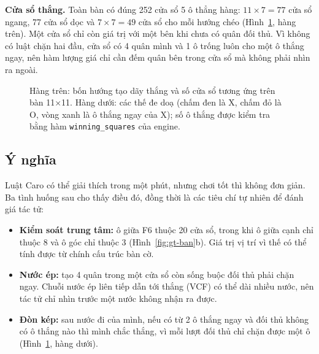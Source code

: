 \textbf{Cửa sổ thắng.} Toàn bàn có đúng 252 cửa sổ 5 ô thẳng hàng: $11 \times 7 = 77$ cửa sổ ngang, 77 cửa sổ dọc và $7 \times 7 = 49$ cửa sổ cho mỗi hướng chéo (Hình~\ref{fig:gt-mau}, hàng trên). Một cửa sổ chỉ còn giá trị với một bên khi chưa có quân đối thủ. Vì không có luật chặn hai đầu, cửa sổ có 4 quân mình và 1 ô trống luôn cho một ô thắng ngay, nên hàm lượng giá chỉ cần đếm quân bên trong cửa sổ mà không phải nhìn ra ngoài.

\begin{figure}[!htb]
  \centering
  
  \caption{Hàng trên: bốn hướng tạo dãy thắng và số cửa sổ tương ứng trên bàn 11×11. Hàng dưới: các thế đe doạ (chấm đen là X, chấm đỏ là O, vòng xanh là ô thắng ngay của X); số ô thắng được kiểm tra bằng hàm \texttt{winning\_squares} của engine.}
  \label{fig:gt-mau}
\end{figure}

\subsection{Ý nghĩa}
\label{sec:gt-y-nghia}
Luật Caro có thể giải thích trong một phút, nhưng chơi tốt thì không đơn giản. Ba tình huống sau cho thấy điều đó, đồng thời là các tiêu chí tự nhiên để đánh giá tác tử:
\begin{itemize}
  \item \textbf{Kiểm soát trung tâm:} ô giữa F6 thuộc 20 cửa sổ, trong khi ô giữa cạnh chỉ thuộc 8 và ô góc chỉ thuộc 3 (Hình~\ref{fig:gt-ban}b). Giá trị vị trí vì thế có thể tính được từ chính cấu trúc bàn cờ.
  \item \textbf{Nước ép:} tạo 4 quân trong một cửa sổ còn sống buộc đối thủ phải chặn ngay. Chuỗi nước ép liên tiếp dẫn tới thắng (VCF) có thể dài nhiều nước, nên tác tử chỉ nhìn trước một nước không nhận ra được.
  \item \textbf{Đòn kép:} sau nước đi của mình, nếu có từ 2 ô thắng ngay và đối thủ không có ô thắng nào thì mình chắc thắng, vì mỗi lượt đối thủ chỉ chặn được một ô (Hình~\ref{fig:gt-mau}, hàng dưới).
\end{itemize}

